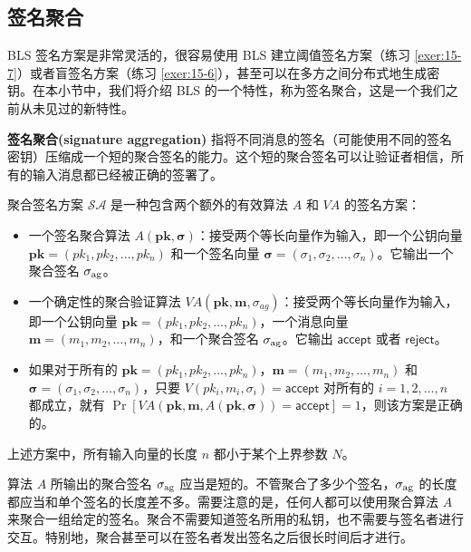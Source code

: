 \subsection{签名聚合}\label{subsec:15-5-2}

BLS 签名方案是非常灵活的，很容易使用 BLS 建立阈值签名方案（练习 \ref{exer:15-7}）或者盲签名方案（练习 \ref{exer:15-6}），甚至可以在多方之间分布式地生成密钥。在本小节中，我们将介绍 BLS 的一个特性，称为签名聚合，这是一个我们之前从未见过的新特性。

\textbf{签名聚合(signature aggregation)} 指将不同消息的签名（可能使用不同的签名密钥）压缩成一个短的聚合签名的能力。这个短的聚合签名可以让验证者相信，所有的输入消息都已经被正确的签署了。

\begin{definition}\label{def:15-4}
聚合签名方案 $\mathcal{S}\mathcal{A}$ 是一种包含两个额外的有效算法 $A$ 和 $\textit{VA}$ 的签名方案：
\begin{itemize}
	\item 一个签名聚合算法 $A(\boldsymbol{pk},\boldsymbol{\sigma})$：接受两个等长向量作为输入，即一个公钥向量 $\boldsymbol{pk}=(pk_1,pk_2,\dots,\allowbreak pk_n)$ 和一个签名向量 $\boldsymbol{\sigma}=(\sigma_1,\sigma_2,\dots,\sigma_n)$。它输出一个聚合签名 $\sigma_{\rm ag}$。
	\item 一个确定性的聚合验证算法 $\textit{VA}(\boldsymbol{pk},\boldsymbol{m},\sigma_{ag})$：接受两个等长向量作为输入，即一个公钥向量 $\boldsymbol{pk}=(pk_1,pk_2,\dots,pk_n)$，一个消息向量 $\boldsymbol{m}=(m_1, m_2, \dots, m_n)$，和一个聚合签名 $\sigma_{\rm ag}$。它输出 $\mathsf{accept}$ 或者 $\mathsf{reject}$。
	\item 如果对于所有的 $\boldsymbol{pk}=(pk_1,pk_2,\dots, pk_n)$，$\boldsymbol{m}=(m_1, m_2, \dots, m_n)$ 和 $\boldsymbol{\sigma}=(\sigma_1, \sigma_2, \dots, \sigma_n)$，只要 $V(pk_i,m_i,\sigma_i)=\mathsf{accept}$ 对所有的 $i=1,2,\dots,n$ 都成立，就有 $\Pr[\textit{VA}(\boldsymbol{pk},\boldsymbol{m},A(\boldsymbol{pk},\boldsymbol{\sigma}))=\mathsf{accept}]=1$，则该方案是正确的。
\end{itemize}
上述方案中，所有输入向量的长度 $n$ 都小于某个上界参数 $N$。
\end{definition}

算法 $A$ 所输出的聚合签名 $\sigma_{\rm ag}$ 应当是短的。不管聚合了多少个签名，$\sigma_{\rm ag}$ 的长度都应当和单个签名的长度差不多。需要注意的是，任何人都可以使用聚合算法 $A$ 来聚合一组给定的签名。聚合不需要知道签名所用的私钥，也不需要与签名者进行交互。特别地，聚合甚至可以在签名者发出签名之后很长时间后才进行。


